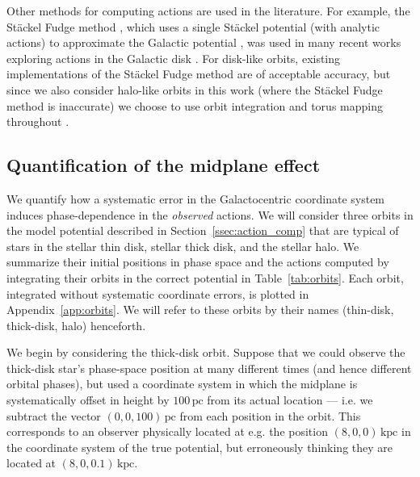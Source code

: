 \documentclass[twocolumn]{aastex62}
\newcommand{\pc}{\text{pc}}
\newcommand{\kpc}{\text{kpc}}
\begin{document}
Other methods for computing actions are used in the literature. For example,
the St\"ackel Fudge method \citep{2016MNRAS.457.2107S}, which uses a single
St\"ackel potential (with analytic actions) to approximate the Galactic
potential \citep{1985MNRAS.216..273D,2012MNRAS.426.1324B}, was used in many
recent works exploring actions in the Galactic disk
\citep[e.g.][]{2019MNRAS.484.3291T,2018MNRAS.481.4093S,2018arXiv180803278T}.
For disk-like orbits, existing implementations of the St\"ackel Fudge method
are of acceptable accuracy, but since we also consider halo-like orbits in
this work (where the St\"ackel Fudge method is inaccurate) we choose to use
orbit integration and torus mapping throughout \citep{2016MNRAS.457.2107S}.

\subsection{Quantification of the midplane effect} \label{ssec:quant}
We quantify how a systematic error in the Galactocentric coordinate system
induces phase-dependence in the {\em observed} actions. We will consider three
orbits in the model potential described in Section~\ref{ssec:action_comp} that
are typical of stars in the stellar thin disk, stellar thick disk, and the
stellar halo. We summarize their initial positions in phase space and the
actions computed by integrating their orbits in the correct potential in
Table~\ref{tab:orbits}. Each orbit, integrated without systematic coordinate
errors, is plotted in Appendix~\ref{app:orbits}. We will refer to these orbits
by their names (thin-disk, thick-disk, halo) henceforth.

We begin by considering the thick-disk orbit. Suppose that we could observe
the thick-disk star's phase-space position at many different times (and hence
different orbital phases), but used a coordinate system in which the midplane
is systematically offset in height by $100\,\pc$ from its actual location ---
i.e. we subtract the vector $(0, 0, 100)\,\pc$ from each position in the
orbit. This corresponds to an observer physically located at e.g. the position
$(8, 0, 0)\,\kpc$ in the coordinate system of the true potential, but
erroneously thinking they are located at $(8, 0, 0.1)\,\kpc$.
\end{document}
